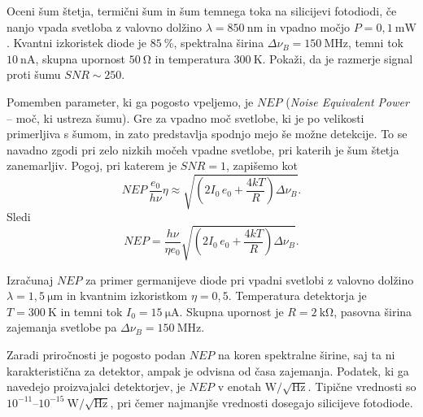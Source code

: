 \begin{definition}
Oceni šum štetja, termični šum in šum temnega toka na silicijevi fotodiodi, če 
nanjo vpada svetloba z valovno dolžino $\lambda=850~\si{\nano\meter}$
in vpadno močjo $P=0,1~\si{\milli\watt}$. Kvantni izkoristek diode je $85~\%$,
spektralna širina $\Delta\nu_B=150~\si{\mega\hertz}$, temni tok $10~\si{\nano\ampere}$,
skupna upornost $50~\si{\ohm}$ in temperatura $300~\si{\kelvin}$. Pokaži, 
da je razmerje signal proti šumu $SNR\sim250$. 
\end{definition}

Pomemben parameter, ki ga pogosto vpeljemo, je $NEP$ ({\it Noise Equivalent Power} -- 
moč, ki ustreza šumu). Gre za vpadno moč svetlobe, ki je po velikosti primerljiva 
s šumom, in zato predstavlja spodnjo mejo še možne detekcije. To se navadno zgodi 
pri zelo nizkih močeh vpadne svetlobe, pri katerih je šum štetja zanemarljiv.
Pogoj, pri katerem je $SNR=1$, zapišemo kot
\begin{equation}
NEP\, \frac{e_0}{h \nu} \eta \approx \sqrt{\left(2 I_0\,e_0
+ \frac{4 kT}{R} \right) \Delta\nu_B}.
\end{equation}
Sledi
\begin{equation}
NEP = \frac{h \nu}{\eta e_0}\sqrt{\left(2 I_0\,e_0
+ \frac{4 kT}{R} \right) \Delta\nu_B}.
\label{NEP}
\end{equation}
\begin{definition}
Izračunaj $NEP$ za primer germanijeve diode pri vpadni svetlobi z valovno dolžino
$\lambda = 1,5~\si{\micro\meter}$ in kvantnim izkoristkom $\eta=0,5$. Temperatura detektorja
je $T=300~\si{\kelvin}$ in temni tok $I_0=15~\si{\micro\ampere}$. Skupna upornost
je $R=2~\si{\kilo\ohm}$, pasovna širina zajemanja svetlobe pa 
$\Delta\nu_B=150~\si{\mega\hertz}$.
\end{definition}

\begin{remark}
Zaradi priročnosti je pogosto podan $NEP$ na koren spektralne širine, saj ta ni 
karakteristična za detektor, ampak je odvisna od časa zajemanja. Podatek, ki 
ga navedejo proizvajalci detektorjev, je $NEP$ v enotah 
$\si{\watt}/\sqrt{\si{\hertz}}$. Tipične vrednosti so 
$10^{-11}$--$10^{-15}~\si{\watt}/\sqrt{\si{\hertz}}$, pri čemer najmanjše vrednosti
dosegajo silicijeve fotodiode. 
\end{remark}

